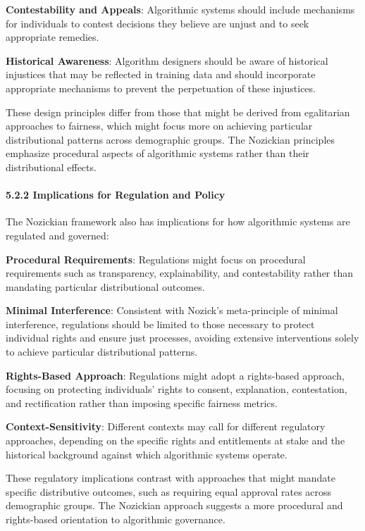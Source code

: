\textbf{Contestability and Appeals}: Algorithmic systems should include
mechanisms for individuals to contest decisions they believe are unjust
and to seek appropriate remedies.

\textbf{Historical Awareness}: Algorithm designers should be aware of
historical injustices that may be reflected in training data and should
incorporate appropriate mechanisms to prevent the perpetuation of these
injustices.

These design principles differ from those that might be derived from
egalitarian approaches to fairness, which might focus more on achieving
particular distributional patterns across demographic groups. The
Nozickian principles emphasize procedural aspects of algorithmic systems
rather than their distributional effects.

\paragraph{5.2.2 Implications for Regulation and
Policy}\label{implications-for-regulation-and-policy}

The Nozickian framework also has implications for how algorithmic
systems are regulated and governed:

\textbf{Procedural Requirements}: Regulations might focus on procedural
requirements such as transparency, explainability, and contestability
rather than mandating particular distributional outcomes.

\textbf{Minimal Interference}: Consistent with Nozick's meta-principle
of minimal interference, regulations should be limited to those
necessary to protect individual rights and ensure just processes,
avoiding extensive interventions solely to achieve particular
distributional patterns.

\textbf{Rights-Based Approach}: Regulations might adopt a rights-based
approach, focusing on protecting individuals' rights to consent,
explanation, contestation, and rectification rather than imposing
specific fairness metrics.

\textbf{Context-Sensitivity}: Different contexts may call for different
regulatory approaches, depending on the specific rights and entitlements
at stake and the historical background against which algorithmic systems
operate.

These regulatory implications contrast with approaches that might
mandate specific distributive outcomes, such as requiring equal approval
rates across demographic groups. The Nozickian approach suggests a more
procedural and rights-based orientation to algorithmic governance.

